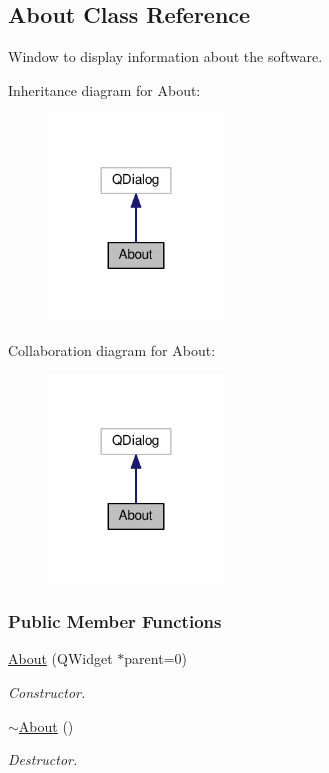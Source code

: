 \hypertarget{class_about}{}\subsection{About Class Reference}
\label{class_about}


Window to display information about the software.  




Inheritance diagram for About\+:
\nopagebreak
\begin{figure}[H]
\begin{center}
\leavevmode
\includegraphics[width=132pt]{class_about__inherit__graph}
\end{center}
\end{figure}


Collaboration diagram for About\+:
\nopagebreak
\begin{figure}[H]
\begin{center}
\leavevmode
\includegraphics[width=132pt]{class_about__coll__graph}
\end{center}
\end{figure}
\subsubsection*{Public Member Functions}
\begin{DoxyCompactItemize}
\item 
\hyperlink{group___window_gab79599ebbcdeffe0a96e00f010e64177}{About} (Q\+Widget $\ast$parent=0)
\begin{DoxyCompactList}\small\item\em Constructor. \end{DoxyCompactList}\item 
\hyperlink{group___window_gace60197b1b610998908036ee1f802204}{$\sim$\+About} ()
\begin{DoxyCompactList}\small\item\em Destructor. \end{DoxyCompactList}\end{DoxyCompactItemize}


